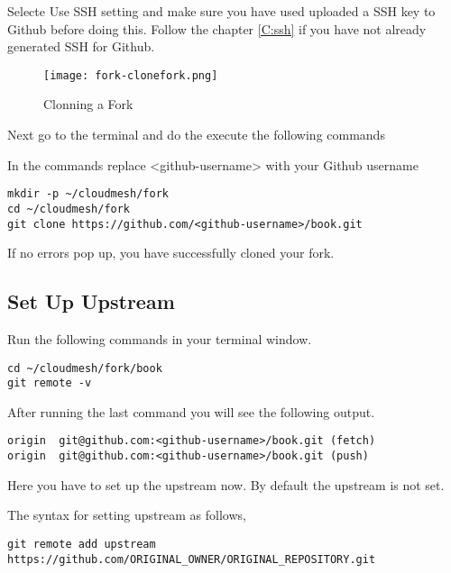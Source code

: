 \begin{NOTE}
  Selecte Use SSH setting and make sure you have used uploaded a
  SSH key to Github before doing this. Follow the chapter \ref{C:ssh} if you have not already generated SSH for Github.
\end{NOTE}


\begin{figure}[htb]\label{fig:clonemyfork}
\centering
\texttt{[image: fork-clonefork.png]}
\caption{Clonning a Fork
}
\end{figure}

Next go to the terminal and do the execute the following commands

\begin{NOTE}
 In the commands replace <github-username> with your Github username
\end{NOTE}

\begin{lstlisting}
mkdir -p ~/cloudmesh/fork
cd ~/cloudmesh/fork
git clone https://github.com/<github-username>/book.git  
\end{lstlisting}

If no errors pop up, you have successfully cloned your fork.

\subsection{Set Up Upstream}

Run the following commands in your terminal window.

\begin{lstlisting}
cd ~/cloudmesh/fork/book
git remote -v
\end{lstlisting}

After running the last command you will see the following
output.

\begin{lstlisting}
origin	git@github.com:<github-username>/book.git (fetch)
origin	git@github.com:<github-username>/book.git (push) 
\end{lstlisting}

Here you have to set up the upstream now. By default the upstream is
not set.

The syntax for setting upstream as follows,

\begin{lstlisting}
git remote add upstream https://github.com/ORIGINAL_OWNER/ORIGINAL_REPOSITORY.git
\end{lstlisting}


